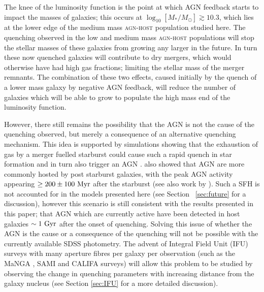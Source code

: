 The knee of the luminosity function is the point at which AGN feedback starts to impact the masses of galaxies; this occurs at $\log_{10}[M_*/M_{\odot}] \gtrsim 10.3$, which lies at the lower edge of the medium mass \textsc{agn-host} population studied here. The quenching observed in the low and medium mass \textsc{agn-host} populations will stop the stellar masses of these galaxies from growing any larger in the future. In turn these now quenched galaxies will contribute to dry mergers, which would otherwise have had high gas fractions; limiting the stellar mass of the merger remnants. The combination of these two effects, caused initially by the quench of a lower mass galaxy by negative AGN feedback, will reduce the number of galaxies which will be able to grow to populate the high mass end of the luminosity function. 

However, there still remains the possibility that the AGN is not the cause of the quenching observed, but merely a consequence of an alternative quenching mechanism. This idea is supported by simulations showing that the exhaustion of gas by a merger fuelled starburst could cause such a rapid quench in star formation and in turn also trigger an AGN \citep{Croton06, Wild09, snyder11, hayward14}. \citet{Yesuf14} also showed that AGN are more commonly hosted by post starburst galaxies, with the peak AGN activity appearing $\geq 200 \pm 100 ~\rm{Myr}$ after the starburst (see also work by \citealt{schawinski09}). Such a SFH is not accounted for in the models presented here (see Section ~\ref{sec:future} for a discussion), however this scenario is still consistent with the results presented in this paper; that AGN which are currently active have been detected in host galaxies $\sim 1~\rm{Gyr}$ after the onset of quenching. Solving this issue of whether the AGN is the cause or a consequence of the quenching will not be possible with the currently available SDSS photometry. The advent of Integral Field Unit (IFU) surveys with many aperture fibres per galaxy per observation (such as the MaNGA \citep{bundy15}, SAMI \citep{croom12} and CALIFA \citep{sanchez12} surveys) will allow this problem to be studied by observing the change in quenching parameters with increasing distance from the galaxy nucleus (see Section \ref{sec:IFU} for a more detailed discussion). 
 

